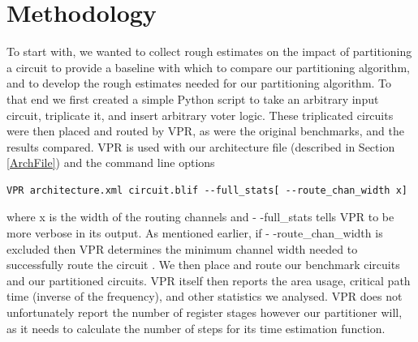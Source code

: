 \documentclass[12pt,final,oneside]{dwThesis} %
\begin{document}
\section{Methodology}\label{BenchmarkMethod}
To start with, we wanted to collect rough estimates on the impact of partitioning a circuit to provide a baseline with which to compare our partitioning algorithm, and to develop the rough estimates needed for our partitioning algorithm. To that end we first created a simple Python script to take an arbitrary input circuit, triplicate it, and insert arbitrary voter logic. These triplicated circuits were then placed and routed by \ac{VPR}, as were the original benchmarks, and the results compared.
\newpage{}
\ac{VPR} is used with our architecture file (described in Section \ref{ArchFile}) and the command line options
\begin{lstlisting}
VPR architecture.xml circuit.blif --full_stats[ --route_chan_width x]
\end{lstlisting} where x is the width of the routing channels and - -full\_stats tells \ac{VPR} to be more verbose in its output.
As mentioned earlier, if - -route\_chan\_width is excluded then \ac{VPR} determines the minimum channel width needed to successfully route the circuit \cite{VPRManual}. We then place and route our benchmark circuits and our partitioned circuits. \ac{VPR} itself then reports the area usage, critical path time (inverse of the frequency), and other statistics we analysed. \ac{VPR} does not unfortunately report the number of register stages however our partitioner will, as it needs to calculate the number of steps for its time estimation function.
\end{document}
